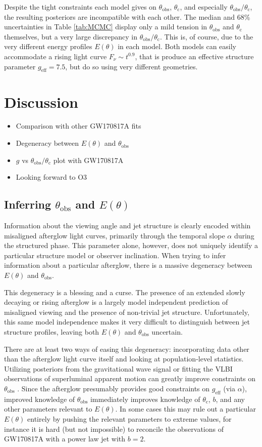 \documentclass[twocolumn]{aastex62}
\newcommand{\gwbns}{GW170817A}
\newcommand{\thobs}{\ensuremath{\theta_{\mathrm{obs}}}}
\newcommand{\thC}{\ensuremath{\theta_{\mathrm{c}}}}
\newcommand{\geff}{\ensuremath{g_{\mathrm{eff}}}}
\begin{document}
Despite the tight constraints each model gives on $\thobs$, $\thC$, and especially $\thobs/\thC$, the resulting posteriors are incompatible with each other.  The median and 68\% uncertainties in Table \ref{tab:MCMC} display only a mild tension in $\thobs$  and $\thC$ themselves, but a very large discrepancy in $\thobs/\thC$.  This is, of course, due to the very different energy profiles $E(\theta)$ in each model.  Both models can easily accommodate a rising light curve $F_\nu \sim t^{0.9}$, that is produce an effective structure parameter $\geff = 7.5$, but do so using very different geometries.  


\section{Discussion}


\begin{itemize}
	\item Comparison with other \gwbns{} fits
	\item Degeneracy between $E(\theta)$ and $\thobs$
	\item $g$ vs $\thobs / \thC$ plot with \gwbns{}
	\item Looking forward to O3
\end{itemize}

\subsection{Inferring $\thobs$ and $E(\theta)$}

Information about the viewing angle and jet structure is clearly encoded within misaligned afterglow light curves, primarily through the temporal slope $\alpha$ during the structured phase.   This parameter alone, however, does not uniquely identify a particular structure model or observer inclination.  When trying to infer information about a particular afterglow, there is a massive degeneracy between $E(\theta)$ and $\thobs$.  

This degeneracy is a blessing and a curse.  The presence of an extended slowly decaying or rising afterglow is a largely model independent prediction of misaligned viewing and the presence of non-trivial jet structure.  Unfortunately, this same model independence makes it very difficult to distinguish between jet structure profiles, leaving both $E(\theta)$ and $\thobs$ uncertain.

There are at least two ways of easing this degeneracy: incorporating data other than the afterglow light curve itself and looking at population-level statistics.  Utilizing posteriors from the gravitational wave signal or fitting the VLBI observations of superluminal apparent motion can greatly improve constraints on $\thobs$ \citep{Troja:2018aa, Hotokezaka:2018aa, Ghirlanda:2019aa}.  Since the afterglow presumably provides good constraints on $\geff$ (via $\alpha$), improved knowledge of $\thobs$ immediately improves knowledge of $\thC$, $b$, and any other parameters relevant to $E(\theta)$.  In some cases this may rule out a particular $E(\theta)$ entirely by pushing the relevant parameters to extreme values, for instance it is hard (but not impossible) to reconcile the observations of \gwbns{} with a power law jet with $b=2$.
\end{document}
